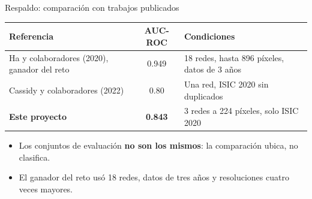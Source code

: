 \documentclass[aspectratio=169,10pt]{beamer}
\begin{document}
\begin{frame}{Respaldo: comparación con trabajos publicados}
  \begin{center}
    \small
    \begin{tabular}{lcl}
      \toprule
      \textbf{Referencia} & \textbf{AUC-ROC} & \textbf{Condiciones} \\
      \midrule
      Ha y colaboradores (2020), ganador del reto & 0.949 & 18 redes, hasta 896 píxeles, datos de 3 años \\
      Cassidy y colaboradores (2022) & 0.80 & Una red, ISIC 2020 sin duplicados \\
      \textbf{Este proyecto} & \textbf{0.843} & 3 redes a 224 píxeles, solo ISIC 2020 \\
      \bottomrule
    \end{tabular}
  \end{center}
  \vspace{0.6em}
  \begin{itemize}
    \item Los conjuntos de evaluación \textbf{no son los mismos}: la comparación ubica, no clasifica.
    \item El ganador del reto usó 18 redes, datos de tres años y resoluciones cuatro veces mayores.
  \end{itemize}
\end{frame}
\end{document}
